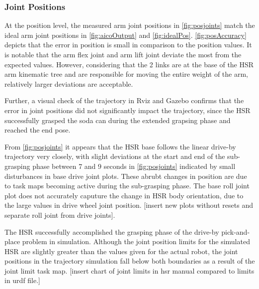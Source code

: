 \documentclass[12pt]{article}
\begin{document}
        \subsubsection{Joint Positions} 
            At the position level, the measured arm joint positions in \cref{fig:posjoints} match the ideal arm joint positions in \cref{fig:aicoOutput} and \cref{fig:idealPos}. \cref{fig:posAccuracy} depicts that the error in position is small in comparison to the position values. It is notable that the arm flex joint and arm lift joint deviate the most from the expected values. However, considering that the 2 links are at the base of the HSR arm kinematic tree and are responsible for moving the entire weight of the arm, relatively larger deviations are acceptable.
            \par Further, a visual check of the trajectory in Rviz and Gazebo confirms that the error in joint positions did not significantly impact the trajectory, since the HSR successfully grasped the soda can during the extended grapsing phase and reached the end pose. \par From \cref{fig:posjoints} it appears that the HSR base follows the linear drive-by trajectory very closely, with slight deviations at the start and end of the sub-grasping phase between 7 and 9 seconds in \cref{fig:posjoints} indicated by small disturbances in base drive joint plots. These abrubt changes in position are due to task maps becoming active during the sub-grasping phase. The base roll joint plot does not accurately caputure the change in HSR body orientation, due to the large values in drive wheel joint position. [insert new plots without resets and separate roll joint from drive joints].
            \par The HSR successfully accomplished the grasping phase of the drive-by pick-and-place problem in simulation. Although the joint position limits for the simulated HSR are slightly greater than the values given for the actual robot, the joint positions in the trajectory simulation fall below both boundaries as a result of the joint limit task map. [insert chart of joint limits in hsr manual compared to limits in urdf file.]
\end{document}
